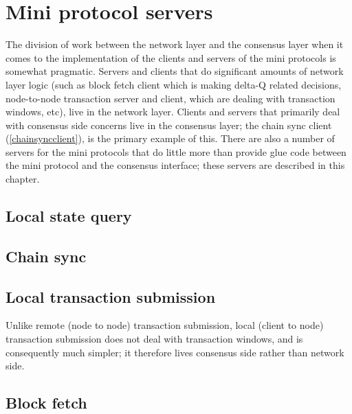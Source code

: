 \chapter{Mini protocol servers}
\label{servers}

The division of work between the network layer and the consensus layer when it
comes to the implementation of the clients and servers of the mini protocols is
somewhat pragmatic. Servers and clients that do significant amounts of network
layer logic (such as block fetch client which is making delta-Q related
decisions, node-to-node transaction server and client, which are dealing with
transaction windows, etc), live in the network layer. Clients and servers that
primarily deal with consensus side concerns live in the consensus layer; the
chain sync client (\cref{chainsyncclient}), is the primary example of this.
There are also a number of servers for the mini protocols that do little more
than provide glue code between the mini protocol and the consensus interface;
these servers are described in this chapter.

\section{Local state query}
\label{servers:lsq}

\section{Chain sync}
\label{servers:chainsync}

\section{Local transaction submission}
\label{servers:txsubmission}

Unlike remote (node to node) transaction submission, local (client to node)
transaction submission does not deal with transaction windows, and is
consequently much simpler; it therefore lives consensus side rather than
network side.

\section{Block fetch}
\label{servers:blockfetch}
